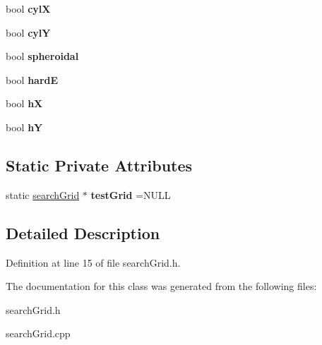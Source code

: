 \begin{DoxyCompactItemize}
bool {\bfseries cylX}
\item 
\mbox{\label{classsearchGrid_aac798e3100138de2d3034770a8582f4b}} 
bool {\bfseries cylY}
\item 
\mbox{\label{classsearchGrid_a80c27d7bcc8c8d7137a1ed3d4e72c38f}} 
bool {\bfseries spheroidal}
\item 
\mbox{\label{classsearchGrid_a9e8d3bd81b5e4622865a277c2ba37b7d}} 
bool {\bfseries hardE}
\item 
\mbox{\label{classsearchGrid_a20bc2be5c27fd9dfce33f2909126d64d}} 
bool {\bfseries hX}
\item 
\mbox{\label{classsearchGrid_a9005a46986570e424cb25f0aa9f5954e}} 
bool {\bfseries hY}
\end{DoxyCompactItemize}
\subsection*{Static Private Attributes}
\begin{DoxyCompactItemize}
\item 
\mbox{\label{classsearchGrid_ab83af0ddb56b1aeafb22539d4ed8d983}} 
static \mbox{\hyperlink{classsearchGrid}{search\+Grid}} $\ast$ {\bfseries test\+Grid} =N\+U\+LL
\end{DoxyCompactItemize}


\subsection{Detailed Description}


Definition at line 15 of file search\+Grid.\+h.



The documentation for this class was generated from the following files\+:\begin{DoxyCompactItemize}
\item 
search\+Grid.\+h\item 
search\+Grid.\+cpp\end{DoxyCompactItemize}
